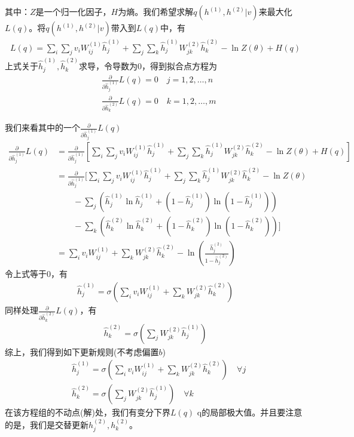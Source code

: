         其中：$Z$是一个归一化因子，$H$为熵。我们希望求解$q(h^{(1)},h^{(2)}|v)$来最大化$L(q)$。将$q(h^{(1)},h^{(2)}|v)$带入到$L(q)$中，有
        \begin{align*}
        L(q) = \sum_i\sum_j v_iW_{i{j}}^{(1)}\hat{h}_j^{(1)} + \sum_j\sum_k\hat{h}_j^{(1)} W_{jk}^{(2)} \hat{h}_k^{(2)} - \ln Z(\theta) + H(q)
        \end{align*}
        上式关于$\hat{h}_j^{(1)},\hat{h}_k^{(2)}$求导，令导数为0，得到拟合点方程为
        \begin{align*}
        & \frac{\partial }{\partial \hat{h}_j^{(1)}} L(q) = 0\quad j = 1,2,\dots,n\\
        & \frac{\partial }{\partial \hat{h}_k^{(2)}} L(q) = 0\quad k = 1,2,\dots,m
        \end{align*}
        \par
        我们来看其中的一个$\frac{\partial }{\partial \hat{h}_j^{(1)}} L(q)$
        \begin{align*}
        \frac{\partial }{\partial \hat{h}_j^{(1)}} L(q) &= \frac{\partial }{\partial \hat{h}_j^{(1)}} \left[ \sum_i\sum_j v_iW_{i{j}}^{(1)}\hat{h}_j^{(1)} + \sum_j\sum_k\hat{h}_j^{(1)} W_{jk}^{(2)} \hat{h}_k^{(2)} - \ln Z(\theta) + H(q) \right]\\
        &= \frac{\partial }{\partial \hat{h}_j^{(1)}} \bigg[ \sum_i\sum_j v_iW_{i{j}}^{(1)}\hat{h}_j^{(1)} + \sum_j\sum_k\hat{h}_j^{(1)} W_{jk}^{(2)} \hat{h}_k^{(2)} - \ln Z(\theta) \\
        &\qquad - \sum_j \left( \hat{h}_j^{(1)}\ln \hat{h}_j^{(1)} + (1-\hat{h}_j^{(1)}) \ln(1-\hat{h}_j^{(1)})  \right) \\
        &\qquad - \sum_k \left( \hat{h}_k^{(2)}\ln \hat{h}_k^{(2)} + (1-\hat{h}_k^{(2)}) \ln(1-\hat{h}_k^{(2)})  \right) \bigg]\\
        &=\sum_{i}v_iW_{ij}^{(1)}+\sum_kW_{jk}^{(2)}\hat{h}_k^{(2)} - \ln \left( \frac{\hat{h}_j^{(2)}}{1-\hat{h}_j^{(2)}} \right)
        \end{align*}
        令上式等于0，有
        \begin{align*}
        \hat{h}_j^{(1)}=\sigma \left( \sum_i v_i W_{ij}^{(1)} + \sum_kW_{jk}^{(2)}\hat{h}_k^{(2)} \right)
        \end{align*}
        同样处理$\frac{\partial }{\partial \hat{h}_k^{(2)}} L(q)$，有
        \begin{align*}
        \hat{h}_k^{(2)}=\sigma \left( \sum_jW_{jk}^{(2)}\hat{h}_j^{(1)} \right)
        \end{align*}
        综上，我们得到如下更新规则(不考虑偏置$b$)
        \begin{align*}
        & \hat{h}_j^{(1)}=\sigma \left( \sum_i v_i W_{ij}^{(1)} + \sum_kW_{jk}^{(2)}\hat{h}_k^{(2)} \right)\quad \forall j\\
        & \hat{h}_k^{(2)}=\sigma \left( \sum_jW_{jk}^{(2)}\hat{h}_j^{(1)} \right)\quad \forall k
        \end{align*}
        在该方程组的不动点(解)处，我们有变分下界$L(q)$ q的局部极大值。并且要注意的是，我们是交替更新$h_j^{(2)},h_k^{(2)}$。
